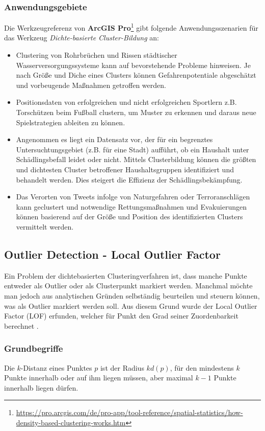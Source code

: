 \documentclass[11pt,ceqn]{book}
\begin{document}
\subsubsection{Anwendungsgebiete}
Die Werkzeugreferenz von \textbf{ArcGIS Pro}\footnote{\url{https://pro.arcgis.com/de/pro-app/tool-reference/spatial-statistics/how-density-based-clustering-works.htm}} gibt folgende Anwendungsszenarien für das Werkzeug \textit{Dichte-basierte Cluster-Bildung} an:

\begin{itemize}
\item Clustering von Rohrbrüchen und Rissen städtischer Wasserversorgungssysteme kann auf bevorstehende Probleme hinweisen. Je nach Größe und Diche eines Clusters können Gefahrenpotentiale abgeschätzt und vorbeugende Maßnahmen getroffen werden.
\item Positionsdaten von erfolgreichen und nicht erfolgreichen Sportlern z.B. Torschützen beim Fußball clustern, um Muster zu erkennen und daraus neue Spielstrategien ableiten zu können.
\item Angenommen es liegt ein Datensatz vor, der für ein begrenztes Untersuchtungsgebiet (z.B. für eine Stadt) aufführt, ob ein Haushalt unter Schädlingsbefall leidet oder nicht. Mittels Clusterbildung können die größten und dichtesten Cluster betroffener Haushaltsgruppen identifiziert und behandelt werden. Dies steigert die Effizienz der Schädlingsbekämpfung.
\item Das Verorten von Tweets infolge von Naturgefahren oder Terroranschlägen kann geclustert und notwendige Rettungsmaßnahmen und Evakuierungen können basierend auf der Größe und Position des identifizierten Clusters vermittelt werden.
\end{itemize}


\subsection{Outlier Detection - Local Outlier Factor}
Ein Problem der dichtebasierten Clusteringverfahren ist, dass manche Punkte entweder als Outlier oder als Clusterpunkt markiert werden. Manchmal möchte man jedoch aus analytischen Gründen selbständig beurteilen und steuern können, was als Outlier markiert werden soll. Aus diesem Grund wurde der Local Outlier Factor (LOF) erfunden, welcher für Punkt den Grad seiner Zuordenbarkeit berechnet \cite{lof}.

\subsubsection{Grundbegriffe}
Die $k$-Distanz eines Punktes $p$ ist der Radius $kd(p)$, für den mindestens $k$ Punkte innerhalb oder auf ihm liegen müssen, aber maximal $k-1$ Punkte innerhalb liegen dürfen. \\
\end{document}
